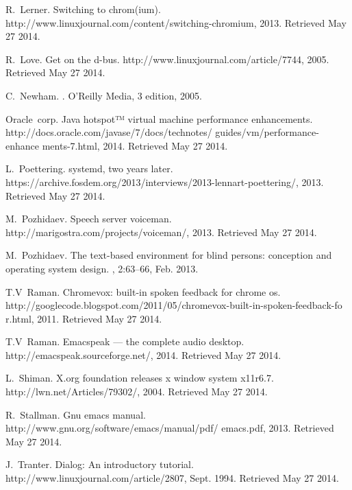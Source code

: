 \documentclass{acm_proc_article-sp}
\begin{document}
\begin{thebibliography}{10}
R.~Lerner.
\newblock Switching to chrom(ium).
\newblock http://www.linuxjournal.com/content/switching-chromium, 2013.
\newblock Retrieved May 27 2014.

R.~Love.
\newblock Get on the d-bus.
\newblock http://www.linuxjournal.com/article/7744, 2005.
\newblock Retrieved May 27 2014.

C.~Newham.
.
\newblock O'Reilly Media, 3 edition, 2005.

Oracle~corp.
\newblock Java hotspot™ virtual machine performance enhancements.
\newblock
  http://docs.oracle.com/javase/7/docs/technotes/ guides/vm/performance-enhance%
ments-7.html, 2014.
\newblock Retrieved May 27 2014.

L.~Poettering.
\newblock systemd, two years later.
\newblock https://archive.fosdem.org/2013/interviews/2013-lennart-poettering/,
  2013.
\newblock Retrieved May 27 2014.

M.~Pozhidaev.
\newblock Speech server voiceman.
\newblock http://marigostra.com/projects/voiceman/, 2013.
\newblock Retrieved May 27 2014.

M.~Pozhidaev.
\newblock The text-based environment for blind persons: conception and
  operating system design.
, 2:63--66, Feb.
  2013.

T.V~Raman.
\newblock Chromevox: built-in spoken feedback for chrome os.
\newblock
  http://googlecode.blogspot.com/2011/05/chromevox-built-in-spoken-feedback-fo%
r.html, 2011.
\newblock Retrieved May 27 2014.

T.V~Raman.
\newblock Emacspeak --- the complete audio desktop.
\newblock http://emacspeak.sourceforge.net/, 2014.
\newblock Retrieved May 27 2014.

L.~Shiman.
\newblock X.org foundation releases x window system x11r6.7.
\newblock http://lwn.net/Articles/79302/, 2004.
\newblock Retrieved May 27 2014.

R.~Stallman.
\newblock Gnu emacs manual.
\newblock http://www.gnu.org/software/emacs/manual/pdf/ emacs.pdf, 2013.
\newblock Retrieved May 27 2014.

J.~Tranter.
\newblock Dialog: An introductory tutorial.
\newblock http://www.linuxjournal.com/article/2807, Sept. 1994.
\newblock Retrieved May 27 2014.


\end{thebibliography}
\end{document}
